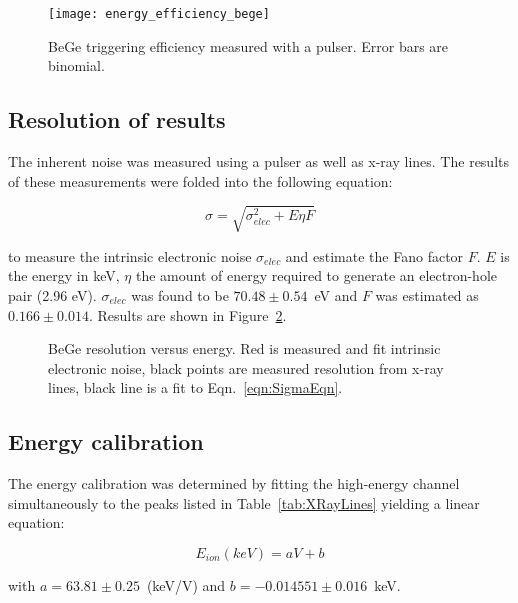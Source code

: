 			\begin{figure}
				\centering
				\texttt{[image: energy\_efficiency\_bege]}
				\caption[BeGe triggering efficiency measured with a pulser]
				{BeGe triggering efficiency measured with a pulser.  Error bars are binomial.}
				\label{fig:BeGeTriggeringEfficiency}
			\end{figure}

		\subsection{Resolution of results}

The inherent noise was measured using a pulser as well as x-ray lines.  The results of these measurements were folded into the following equation:

			\begin{equation}
				\sigma = \sqrt{\sigma_{elec}^{2} + E \eta F}
				\label{eqn:SigmaEqn}
			\end{equation}

to measure the intrinsic electronic noise $\sigma_{elec}$ and estimate the Fano factor $F$.  $E$ is the energy in keV, $\eta$ the amount of energy required to generate an electron-hole pair (2.96 eV).  $\sigma_{elec}$ was found to be $70.48\pm0.54$~eV and $F$ was estimated as $0.166\pm0.014$.  Results are shown in Figure~\ref{fig:BeGeResPlot}.

			\begin{figure}
				\centering
				\caption[BeGe resolution versus energy]
				{BeGe resolution versus energy.  Red is measured and fit intrinsic electronic noise, 
				black points are measured resolution from x-ray lines, black line is a fit to 
				Eqn.~\ref{eqn:SigmaEqn}.}
				\label{fig:BeGeResPlot}
			\end{figure}

		\subsection{Energy calibration}

The energy calibration was determined by fitting the high-energy channel simultaneously to the peaks listed in Table~\ref{tab:XRayLines} yielding a linear equation:

			\[
			E_{ion} (keV) = a V + b
			\]  

with $a = 63.81\pm0.25$~(keV/V) and $b = -0.014551\pm0.016$~keV.


